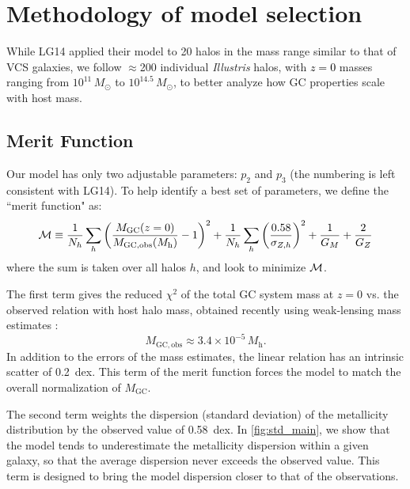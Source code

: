 \documentclass[fleqn,usenatbib]{mnras}
\newcommand{\rev}[1]{\textcolor{black}{#1}}
\newcommand{\Mh}{M_{\mathrm{h}}}
\newcommand{\Msun}{\,M_{\odot}}
\newcommand{\Mgc}{M_{\mathrm{GC}}}
\newcommand{\Mgcobs}{M_{\mathrm{GC,obs}}}
\begin{document}
\section{Methodology of model selection}
\label{sec:Methodology}

While LG14 applied their model to 20 halos in the mass range similar to that of VCS galaxies, we follow $\approx$200 individual \textit{Illustris} halos, with \rev{$z=0$} masses ranging from $10^{11}\Msun$ to $10^{14.5}\Msun$, to better analyze how GC properties scale with host mass. 

\subsection{Merit Function}
\label{subsec:merit}

Our model has only two adjustable parameters: $p_2$ and $p_3$ (the numbering is left consistent with LG14). To help identify a best set of parameters, we define the ``merit function" as:
\begin{equation}
  {\cal M} \equiv
  \frac{1}{N_h} \sum_h \left(\frac{\Mgc(z=0)}{\Mgcobs(\Mh)} - 1 \right)^2
  + \frac{1}{N_h}\sum_{h}  \left( \frac{0.58}{\sigma_{Z, h} } \right)^2
  + \frac{1}{G_{M}} + \frac{2}{G_{Z}}
  \label{eqn:merit}
\end{equation}
where the sum is taken over all halos $h$, and look to minimize ${\cal M}$.

The first term gives the reduced $\chi^2$ of the total GC system mass at $z=0$ vs. the observed relation with host halo mass, obtained recently using weak-lensing mass estimates \citep[e.g.,][]{hudson_etal_2014, harris_etal_2015}:
\begin{equation}
  \Mgcobs \approx 3.4 \times 10^{-5}\, \Mh.
  \label{eq:mgcobs}
\end{equation}
In addition to the errors of the mass estimates, the linear relation has an intrinsic scatter of 0.2~dex. This term of the merit function forces the model to match the overall normalization of $\Mgc$.

The second term weights the dispersion (standard deviation) of the metallicity distribution by the observed value of 0.58~dex. In \autoref{fig:std_main}, we show that the model tends to underestimate the metallicity dispersion within a given galaxy, so that the average dispersion never exceeds the observed value. This term is designed to bring the model dispersion closer to that of the observations.
\end{document}
